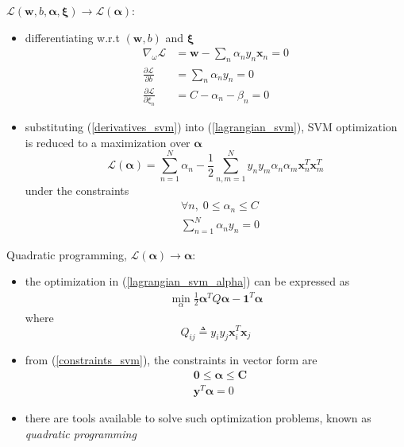 \documentclass[onecolumn]{IEEEtran}
\newcommand{\beq}{\begin{equation}}
\newcommand{\eeq}{\end{equation}}
\newcommand{\bi}{\begin{itemize}}
\newcommand{\ei}{\end{itemize}}
\begin{document}
\begin{itemize}
    \ei
    \item $\mathcal{L}(\bm{w},b,\bm{\alpha},\bm{\xi})\rightarrow \mathcal{L}(\bm{\alpha})$:
    \bi
        \item differentiating w.r.t $(\bm{w},b)$ and $\bm{\xi}$
        \beq\label{derivatives_svm}\begin{split}
            \nabla_\omega \mathcal{L} &= \bm{w} - \sum_n \alpha_n y_n \bm{x}_n = 0\\
            \frac{\partial \mathcal{L}}{\partial b} &= \sum_n \alpha_n y_n = 0\\
            \frac{\partial \mathcal{L}}{\partial \xi_n} &= C -\alpha_n - \beta_n = 0
        \end{split}\eeq
        \item substituting (\ref{derivatives_svm}) into (\ref{lagrangian_svm}), SVM optimization is reduced to a maximization over $\bm{\alpha}$
        \beq\label{lagrangian_svm_alpha}
            \mathcal{L}(\bm{\alpha}) = \sum_{n=1}^{N}\alpha_n - \frac{1}{2}\sum_{n,m=1}^{N}y_ny_m\alpha_n\alpha_m \bm{x}^T_n \bm{x}^T_m
        \eeq
        under the constraints
        \beq\label{constraints_svm}\begin{split}
            &\forall n, \; 0  \leq \alpha_n \leq C\\
            &\sum_{n=1}^{N} \alpha_n y_n = 0
        \end{split}\eeq
    \ei
    \item Quadratic programming, $\mathcal{L}(\bm{\alpha})\rightarrow \bm{\alpha}$:
    \bi
        \item the optimization in (\ref{lagrangian_svm_alpha}) can be expressed as
        \beq\label{lagrangian_svm_alpha_b}\begin{split}
             \min_\alpha  \frac{1}{2}\bm{\alpha}^T Q \bm{\alpha} - \bm{1}^T \bm{\alpha}
        \end{split}\eeq
        where
        \beq\label{matrix_svm}
            Q_{ij} \triangleq  y_i y_j \bm{x}^T_i \bm{x}_j
        \eeq
        \item from (\ref{constraints_svm}), the constraints in vector form are
        \beq\label{constraints_svm_b}\begin{split}
            &\bm{0} \leq \bm{\alpha} \leq \bm{C}\\
            &\bm{y}^T \bm{\alpha}  = 0
        \end{split}\eeq
        \item there are tools available to solve such optimization problems, known as \emph{quadratic programming}

\end{itemize}
\end{document}
